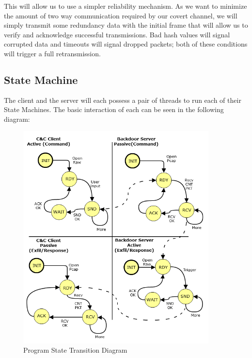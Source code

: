 \documentclass[titlepage]{article}
\begin{document}
This will allow us to use a simpler reliability mechanism. As we want to minimize the amount of two way communication required by our covert channel, we will simply transmit some
redundancy data with the initial frame that will allow us to verify and acknowledge successful transmissions.  Bad hash values will signal corrupted data and timeouts will
signal dropped packets; both of these conditions will trigger a full retransmission.

\clearpage

\subsection{State Machine}

The client and the server will each possess a pair of threads to run each of their State Machines.  The basic interaction of each can be seen in the following diagram:

\begin{figure}[htb]                                                                       
  \begin{center}
    \includegraphics[width=0.9\textwidth]{imgs/std.png}
  \end{center}
  \caption{Program State Transition Diagram}
  \label{fig:std}
\end{figure}
\end{document}

